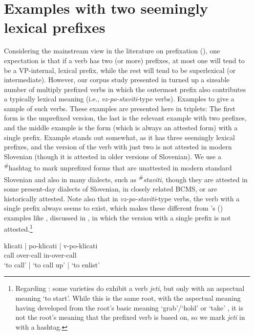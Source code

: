 \documentclass[output=paper,colorlinks,citecolor=brown]{langscibook}
\begin{document}
\section{Examples with two seemingly lexical prefixes}\label{sec:4unexpectedStacking}
Considering the mainstream view in the literature on prefixation (), one expectation is that if a verb has two (or more) prefixes, at most one will tend to be a VP-internal, lexical prefix, while the rest will tend to be superlexical (or intermediate). However, our corpus study presented in  turned up a sizeable number of multiply prefixed verbs in which the outermost prefix also contributes a typically lexical meaning (i.e., \textit{vz-po-staviti}-type verbs). Examples  to  give a sample of such verbs. These examples are presented here in triplets: The first form is the unprefixed version, the last is the relevant example with two prefixes, and the middle example is the form (which is always an attested form) with a single prefix. Example  stands out somewhat, as it has three seemingly lexical prefixes, and the version of the verb with just two is not attested in modern Slovenian (though it is attested in older versions of Slovenian).  We use a \textsuperscript{\#}hashtag to mark unprefixed forms that are unattested in modern standard Slovenian and also in many dialects, such as \textsuperscript{\#}\textit{staviti}, though they are attested in some present-day dialects of Slovenian, in closely related BCMS, or are historically attested. Note also that in \textit{vz-po-staviti}-type verbs, the verb with a single prefix always seems to exist, which makes these different from 
\citeauthor{zaucer2002role}'s  (\citeyear{zaucer2002role})
examples like , discussed in \citet{svenonius2004slavic}, in which the version with a single prefix is not attested.\footnote{Regarding : some varieties do exhibit a verb \textit{jeti}, but only with an aspectual meaning `to start'. While this is the same root, with the aspectual meaning having developed from the root's basic meaning `grab'/`hold' or `take' \citep{snoj2009}, it is not the root's meaning that the prefixed verb is based on, so we mark \textit{jeti} in  with a hashtag.}


\ea \glll klicati | po-klicati | v-po-klicati\\
call  {} over-call  {} in-over-call\\
{`to call'} |  {`to call up'}  | {`to enlist'}\label{ex:klicati}\\
\z
\end{document}
